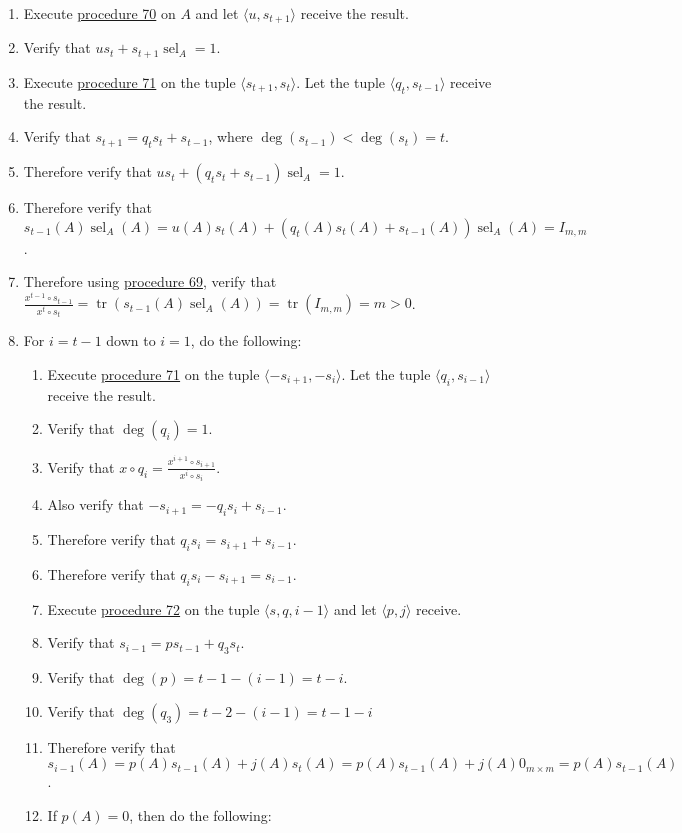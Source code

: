 \documentclass[twocolumn]{article}
\DeclareMathOperator{\tr}{tr}
\DeclareMathOperator{\sel}{sel}
\begin{document}
				\begin{enumerate}
					\item Execute \hyperref[sec:procedure 70]{procedure 70} on $A$ and let $\langle u,s_{t+1}\rangle$ receive the result.
					\item Verify that $us_t+s_{t+1}\sel_A=1$.
					\item Execute \hyperref[sec:procedure 71]{procedure 71} on the tuple $\langle s_{t+1},s_t\rangle$. Let the tuple $\langle q_t,s_{t-1}\rangle$ receive the result.
					\item Verify that $s_{t+1}=q_ts_t+s_{t-1}$, where $\deg(s_{t-1})<\deg(s_t)=t$.
					\item Therefore verify that $us_t+(q_ts_t+s_{t-1})\sel_A=1$.
					\item Therefore verify that $s_{t-1}(A)\sel_A(A)=u(A)s_t(A)+(q_t(A)s_t(A)+s_{t-1}(A))\sel_A(A)=I_{m,m}$.
					\item Therefore using \hyperref[sec:procedure 69]{procedure 69}, verify that $\frac{x^{t-1}\circ s_{t-1}}{x^t\circ s_t}=\tr(s_{t-1}(A)\sel_A(A))=\tr(I_{m,m})=m>0$.
					\item For $i=t-1$ down to $i=1$, do the following:
					\begin{enumerate}
						\item Execute \hyperref[sec:procedure 71]{procedure 71} on the tuple $\langle -s_{i+1},-s_i\rangle$. Let the tuple $\langle q_i,s_{i-1}\rangle$ receive the result.
						\item Verify that $\deg(q_i)=1$.
						\item Verify that $x\circ q_i=\frac{x^{i+1}\circ s_{i+1}}{x^i\circ s_i}$.
						\item Also verify that $-s_{i+1}=-q_is_i+s_{i-1}$.
						\item Therefore verify that $q_is_i=s_{i+1}+s_{i-1}$.
						\item Therefore verify that $q_is_i-s_{i+1}=s_{i-1}$.
						\item Execute \hyperref[sec:procedure 72]{procedure 72} on the tuple $\langle s,q,i-1\rangle$ and let $\langle p,j\rangle$ receive.
						\item Verify that $s_{i-1}=ps_{t-1}+q_3s_t$.
						\item Verify that $\deg(p)=t-1-(i-1)=t-i$.
						\item Verify that $\deg(q_3)=t-2-(i-1)=t-1-i$
						\item Therefore verify that $s_{i-1}(A)=p(A)s_{t-1}(A)+j(A)s_t(A)=p(A)s_{t-1}(A)+j(A)0_{m\times m}=p(A)s_{t-1}(A)$.
						\item If $p(A)=0$, then do the following:

\end{enumerate}
\end{enumerate}
\end{document}
